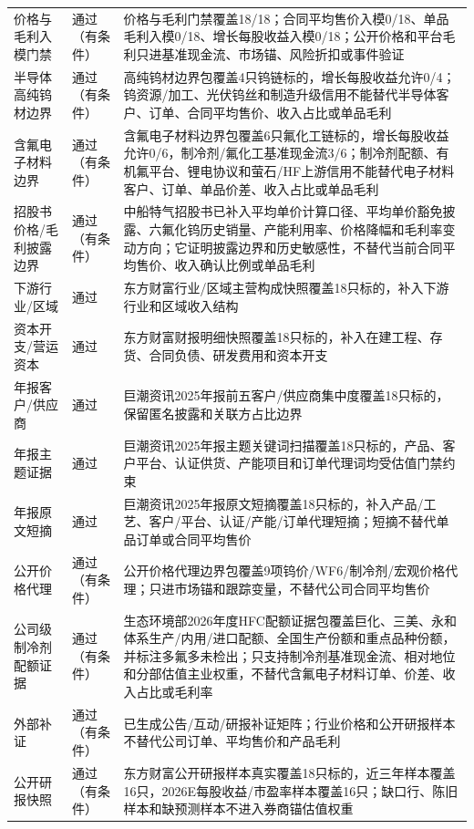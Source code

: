 \begin{exhibitbox}[估值审计摘要]
{\begin{tabular}{lll}
价格与毛利入模门禁 & 通过（有条件） & 价格与毛利门禁覆盖18/18；合同平均售价入模0/18、单品毛利入模0/18、增长每股收益入模0/18；公开价格和平台毛利只进基准现金流、市场锚、风险折扣或事件验证 \\
半导体高纯钨材边界 & 通过（有条件） & 高纯钨材边界包覆盖4只钨链标的，增长每股收益允许0/4；钨资源/加工、光伏钨丝和制造升级信用不能替代半导体客户、订单、合同平均售价、收入占比或单品毛利 \\
含氟电子材料边界 & 通过（有条件） & 含氟电子材料边界包覆盖6只氟化工链标的，增长每股收益允许0/6，制冷剂/氟化工基准现金流3/6；制冷剂配额、有机氟平台、锂电协议和萤石/HF上游信用不能替代电子材料客户、订单、单品价差、收入占比或单品毛利 \\
招股书价格/毛利披露边界 & 通过（有条件） & 中船特气招股书已补入平均单价计算口径、平均单价豁免披露、六氟化钨历史销量、产能利用率、价格降幅和毛利率变动方向；它证明披露边界和历史敏感性，不替代当前合同平均售价、收入确认比例或单品毛利 \\
下游行业/区域 & 通过 & 东方财富行业/区域主营构成快照覆盖18只标的，补入下游行业和区域收入结构 \\
资本开支/营运资本 & 通过 & 东方财富财报明细快照覆盖18只标的，补入在建工程、存货、合同负债、研发费用和资本开支 \\
年报客户/供应商 & 通过 & 巨潮资讯2025年报前五客户/供应商集中度覆盖18只标的，保留匿名披露和关联方占比边界 \\
年报主题证据 & 通过 & 巨潮资讯2025年报主题关键词扫描覆盖18只标的，产品、客户平台、认证供货、产能项目和订单代理词均受估值门禁约束 \\
年报原文短摘 & 通过 & 巨潮资讯2025年报原文短摘覆盖18只标的，补入产品/工艺、客户/平台、认证/产能/订单代理短摘；短摘不替代单品订单或合同平均售价 \\
公开价格代理 & 通过（有条件） & 公开价格代理边界包覆盖9项钨价/WF6/制冷剂/宏观价格代理；只进市场锚和跟踪变量，不替代公司合同平均售价 \\
公司级制冷剂配额证据 & 通过（有条件） & 生态环境部2026年度HFC配额证据包覆盖巨化、三美、永和体系生产/内用/进口配额、全国生产份额和重点品种份额，并标注多氟多未检出；只支持制冷剂基准现金流、相对地位和分部估值主业权重，不替代含氟电子材料订单、价差、收入占比或毛利率 \\
外部补证 & 通过（有条件） & 已生成公告/互动/研报补证矩阵；行业价格和公开研报样本不替代公司订单、平均售价和产品毛利 \\
公开研报快照 & 通过（有条件） & 东方财富公开研报样本真实覆盖18只标的，近三年样本覆盖16只，2026E每股收益/市盈率样本覆盖16只；缺口行、陈旧样本和缺预测样本不进入券商锚估值权重 \\

\end{tabular}}
\end{exhibitbox}
